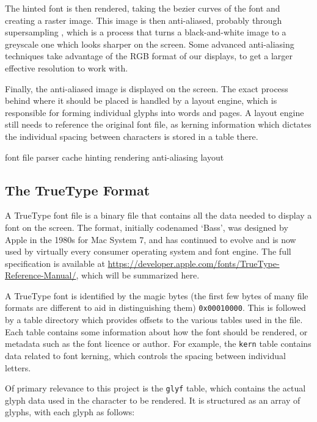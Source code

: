 \documentclass{report}
\begin{document}
The hinted font is then rendered, taking the bezier curves of the font and
creating a raster image. This image is then anti-aliased, probably through
supersampling , which is a process that turns a
black-and-white image to a greyscale one which looks sharper on the screen. Some
advanced anti-aliasing techniques take advantage of the RGB format of our
displays, to get a larger effective resolution to work with.

Finally, the anti-aliased image is displayed on the screen. The exact process
behind where it should be placed is handled by a layout engine, which is
responsible for forming individual glyphs into words and pages. A layout engine
still needs to reference the original font file, as kerning information which
dictates the individual spacing between characters is stored in a table there.

font file \rightarrow parser \rightarrow cache \rightarrow hinting \rightarrow
rendering \rightarrow anti-aliasing \rightarrow layout


\subsection{The TrueType Format}
A TrueType font file is a binary file that contains all the data needed to
display a font on the screen. The format, initially codenamed `Bass', was
designed by Apple in the 1980s for Mac System 7, and has continued to evolve and
is now used by virtually every consumer operating system and font engine. The
full specification is available at
\url{https://developer.apple.com/fonts/TrueType-Reference-Manual/}, which will
be summarized here.

A TrueType font is identified by the magic bytes (the first few bytes of many
file formats are different to aid in distinguishing them) \texttt{0x00010000}.
This is followed by a table directory which provides offsets to the various
tables used in the file. Each table contains some information about how the font
should be rendered, or metadata such as the font licence or author. For example,
the \texttt{kern} table contains data related to font kerning, which controls
the spacing between individual letters.

Of primary relevance to this project is the \texttt{glyf} table, which contains
the actual glyph data used in the character to be rendered. It is structured as
an array of glyphs, with each glyph as follows:
\end{document}
